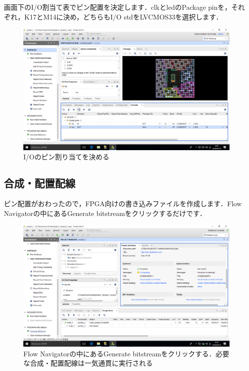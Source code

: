 \documentclass[a4paper,dvipdfmx]{jsarticle}
\begin{document}
画面下のI/O割当て表でピン配置を決定します．clkとledのPackage pinを，それぞれ，K17とM14に決め，どちらもI/O stdをLVCMOS33を選択します．
 \begin{figure}[H]
  \begin{center}
   \includegraphics[width=.8\textwidth]{chapter03_figures/VirtualBox_Windows10_19_03_2018_00_45_27.png}
  \end{center}
  \caption{I/Oのピン割り当てを決める}
 \end{figure}

\subsection{合成・配置配線}
ピン配置がおわったので，FPGA向けの書き込みファイルを作成します．Flow Navigatorの中にあるGenerate bitstreamをクリックするだけです．

 \begin{figure}[H]
  \begin{center}
   \includegraphics[width=.8\textwidth]{chapter03_figures/VirtualBox_Windows10_19_03_2018_00_15_52.png}
  \end{center}
  \caption{Flow Navigatorの中にあるGenerate bitstreamをクリックする．必要な合成・配置配線は一気通貫に実行される \label{fig:file_save_dialog}}
 \end{figure}
\end{document}
